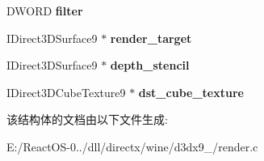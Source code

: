 \begin{DoxyCompactItemize}
D\+W\+O\+RD {\bfseries filter}
\item 
\mbox{\label{structrender__to__envmap_a7272ea19acf996dfea51494f1dcc33a0}} 
I\+Direct3\+D\+Surface9 $\ast$ {\bfseries render\+\_\+target}
\item 
\mbox{\label{structrender__to__envmap_ade9ecee31a92dda0ab4ee0340cc81096}} 
I\+Direct3\+D\+Surface9 $\ast$ {\bfseries depth\+\_\+stencil}
\item 
\mbox{\label{structrender__to__envmap_acc1bd62dfd47cc5940324e0afa7f042b}} 
I\+Direct3\+D\+Cube\+Texture9 $\ast$ {\bfseries dst\+\_\+cube\+\_\+texture}
\end{DoxyCompactItemize}


该结构体的文档由以下文件生成\+:\begin{DoxyCompactItemize}
\item 
E\+:/\+React\+O\+S-\/0../dll/directx/wine/d3dx9\+\_/render.\+c\end{DoxyCompactItemize}
